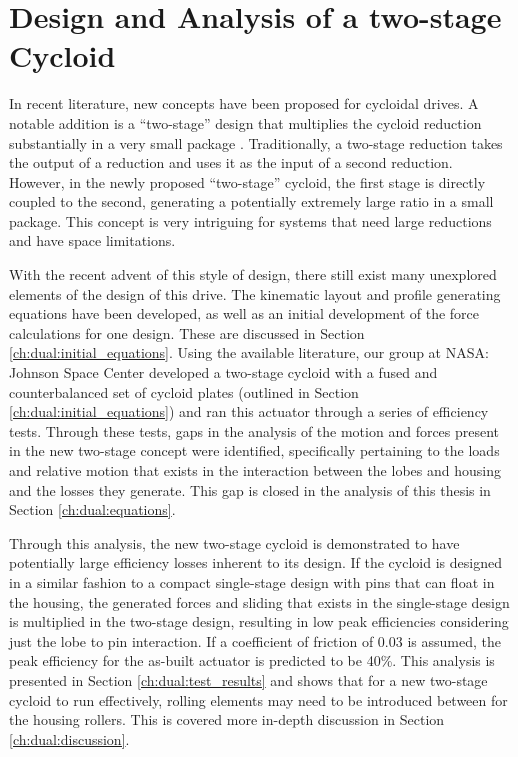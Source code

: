 
\chapter{Design and Analysis of a two-stage Cycloid}\label{ch:dual}

In recent literature, new concepts have been proposed for cycloidal drives. A notable addition is a ``two-stage'' design that multiplies the cycloid reduction substantially in a very small package \cite{ref:new_two_stage}. Traditionally, a two-stage reduction takes the output of a reduction and uses it as the input of a second reduction. However, in the newly proposed ``two-stage'' cycloid, the first stage is directly coupled to the second, generating a potentially extremely large ratio in a small package. This concept is very intriguing for systems that need large reductions and have space limitations. 

With the recent advent of this style of design, there still exist many unexplored elements of the design of this drive. The kinematic layout and profile generating equations have been developed, as well as an initial development of the force calculations for one design. These are discussed in Section \ref{ch:dual:initial_equations}. Using the available literature, our group at NASA: Johnson Space Center developed a two-stage cycloid with a fused and counterbalanced set of cycloid plates (outlined in Section \ref{ch:dual:initial_equations}) and ran this actuator through a series of efficiency tests. Through these tests, gaps in the analysis of the motion and forces present in the new two-stage concept were identified, specifically pertaining to the loads and relative motion that exists in the interaction between the lobes and housing and the losses they generate. This gap is closed in the analysis of this thesis in Section \ref{ch:dual:equations}.

Through this analysis, the new two-stage cycloid is demonstrated to have potentially large efficiency losses inherent to its design. If the cycloid is designed in a similar fashion to a compact single-stage design with pins that can float in the housing, the generated forces and sliding that exists in the single-stage design is multiplied in the two-stage design, resulting in low peak efficiencies considering just the lobe to pin interaction. If a coefficient of friction of 0.03 is assumed, the peak efficiency for the as-built actuator is predicted to be 40\%. This analysis is presented in Section \ref{ch:dual:test_results} and shows that for a new two-stage cycloid to run effectively, rolling elements may need to be introduced between for the housing rollers. This is covered more in-depth discussion in Section \ref{ch:dual:discussion}.

